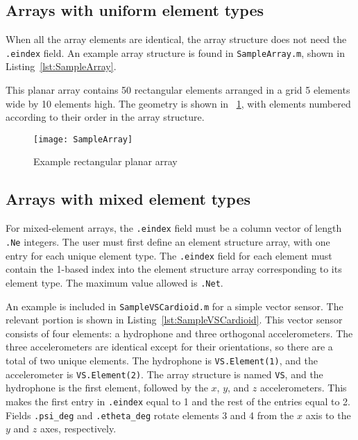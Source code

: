 \subsection{Arrays with uniform element types}

When all the array elements are identical, the array structure does not need the \texttt{.eindex} field. An example array structure is found in \texttt{SampleArray.m}, shown in Listing~\ref{lst:SampleArray}.



This planar array contains 50 rectangular elements arranged in a grid 5 elements wide by 10 elements high. The geometry is shown in \figname~\ref{fig:SampleArray}, with elements numbered according to their order in the array structure.

\begin{figure}[!ht]
\begin{center}
\texttt{[image: SampleArray]}
\caption{\label{fig:SampleArray}Example rectangular planar array}
\end{center}
\end{figure}

\clearpage
\subsection{Arrays with mixed element types}

For mixed-element arrays, the \texttt{.eindex} field must be a column vector of length \texttt{.Ne} integers. The user must first define an element structure array, with one entry for each unique element type. The \texttt{.eindex} field for each element must contain the 1-based index into the element structure array corresponding to its element type. The maximum value allowed is \texttt{.Net}.

An example is included in \texttt{SampleVSCardioid.m} for a simple vector sensor. The relevant portion is shown in Listing~\ref{lst:SampleVSCardioid}. This vector sensor consists of four elements: a hydrophone and three orthogonal accelerometers. The three accelerometers are identical except for their orientations, so there are a total of two unique elements. The hydrophone is \texttt{VS.Element(1)}, and the accelerometer is \texttt{VS.Element(2)}. The array structure is named \texttt{VS}, and the hydrophone is the first element, followed by the $x$, $y$, and $z$ accelerometers. This makes the first entry in \texttt{.eindex} equal to 1 and the rest of the entries equal to 2. Fields \texttt{.psi\_deg} and \texttt{.etheta\_deg} rotate elements 3 and 4 from the $x$ axis to the $y$ and $z$ axes, respectively.


